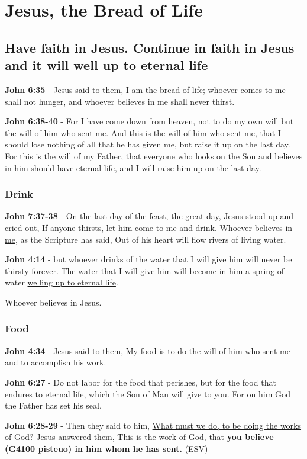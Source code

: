 \documentclass[11pt]{article}
\begin{document}
\section{Jesus, the Bread of Life}
\label{sec:org0e83c0b}
\subsection{Have faith in Jesus. Continue in faith in Jesus and it will well up to eternal life}
\label{sec:orgcd8032c}
\textbf{John 6:35} - Jesus said to them, I am the bread of life; whoever comes to me shall not hunger, and whoever believes in me shall never thirst.

\textbf{John 6:38-40} - For I have come down from heaven, not to do my own will but the will of him who sent me. And this is the will of him who sent me, that I should lose nothing of all that he has given me, but raise it up on the last day. For this is the will of my Father, that everyone who looks on the Son and believes in him should have eternal life, and I will raise him up on the last day.

\subsubsection{Drink}
\label{sec:orgfd33293}
\textbf{John 7:37-38} - On the last day of the feast, the great day, Jesus stood up and cried out, If anyone thirsts, let him come to me and drink. Whoever \uline{believes in me}, as the Scripture has said, Out of his heart will flow rivers of living water.

\textbf{John 4:14} - but whoever drinks of the water that I will give him will never be thirsty forever. The water that I will give him will become in him a spring of water \uline{welling up to eternal life}.

Whoever believes in Jesus.

\subsubsection{Food}
\label{sec:org6d8665b}
\textbf{John 4:34} - Jesus said to them, My food is to do the will of him who sent me and to accomplish his work.

\textbf{John 6:27} - Do not labor for the food that perishes, but for the food that endures to eternal life, which the Son of Man will give to you. For on him God the Father has set his seal.

\textbf{John 6:28-29} - Then they said to him, \uline{What must we do, to be doing the works of God?} Jesus answered them, This is the work of God, that \textbf{you believe (G4100 pisteuo) in him whom he has sent.} (ESV)
\end{document}
